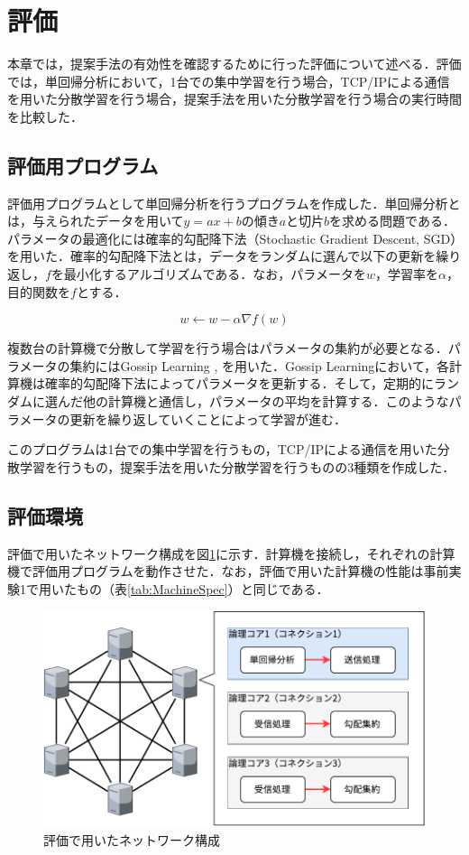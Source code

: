 \section{評価}
\label{sec:Evaluation}
本章では，提案手法の有効性を確認するために行った評価について述べる．評価では，単回帰分析において，1台での集中学習を行う場合，TCP/IPによる通信を用いた分散学習を行う場合，提案手法を用いた分散学習を行う場合の実行時間を比較した．

\subsection{評価用プログラム}
評価用プログラムとして単回帰分析を行うプログラムを作成した．単回帰分析とは，与えられたデータを用いて$y = ax + b$の傾き$a$と切片$b$を求める問題である．パラメータの最適化には確率的勾配降下法（Stochastic Gradient Descent, SGD）を用いた．確率的勾配降下法とは，データをランダムに選んで以下の更新を繰り返し，$f$を最小化するアルゴリズムである．なお，パラメータを$w$，学習率を$\alpha$，目的関数を$f$とする．

\begin{equation}
  w \leftarrow w - \alpha \nabla f(w)
\end{equation}

複数台の計算機で分散して学習を行う場合はパラメータの集約が必要となる．パラメータの集約にはGossip Learning \cite{Gossip1}, \cite{Gossip2} を用いた．Gossip Learningにおいて，各計算機は確率的勾配降下法によってパラメータを更新する．そして，定期的にランダムに選んだ他の計算機と通信し，パラメータの平均を計算する．このようなパラメータの更新を繰り返していくことによって学習が進む．

このプログラムは1台での集中学習を行うもの，TCP/IPによる通信を用いた分散学習を行うもの，提案手法を用いた分散学習を行うものの3種類を作成した．

\subsection{評価環境}
評価で用いたネットワーク構成を図\ref{fig:Evaluation}に示す．計算機を接続し，それぞれの計算機で評価用プログラムを動作させた．なお，評価で用いた計算機の性能は事前実験1で用いたもの（表\ref{tab:MachineSpec}）と同じである．

\begin{figure}[htb]
  \centering
  \includegraphics[width=\columnwidth]{pictures/EvaluationNetwork.pdf}
  \caption{評価で用いたネットワーク構成}
  \label{fig:Evaluation}
\end{figure}

